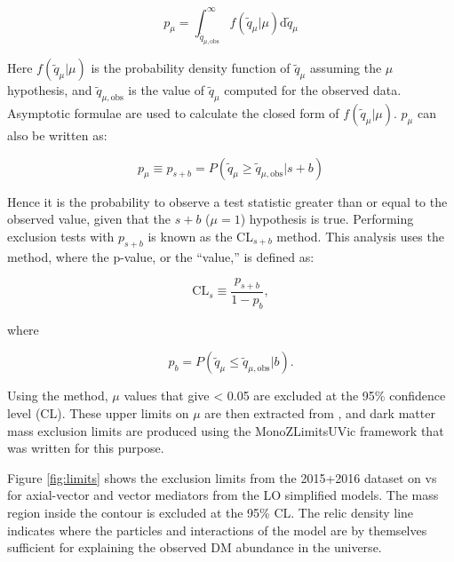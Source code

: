 \begin{equation}
p_\mu = \int_{\tilde{q}_{\mu,\text{obs}}}^\infty f(\tilde{q}_\mu | \mu) \text{d}\tilde{q}_\mu
\label{eqn:pmu}
\end{equation}

\noindent Here $f(\tilde{q}_\mu | \mu)$ is the probability density function of $\tilde{q}_\mu$ assuming the $\mu$ hypothesis, and $\tilde{q}_{\mu,\text{obs}}$ is the value of $\tilde{q}_\mu$ computed for the observed data.
Asymptotic formulae \cite{Cowan:2010js} are used to calculate the closed form of $f(\tilde{q}_\mu | \mu)$. $p_\mu$ can also be written as:

\begin{equation}
p_\mu \equiv p_{s+b} = P(\tilde q_\mu \geq \tilde{q}_{\mu,\text{obs}} | s+b)
\end{equation}

\noindent Hence it is the probability to observe a test statistic greater than or equal to the observed value, given that the $s+b$ ($\mu=1$) hypothesis is true. Performing exclusion tests with $p_{s+b}$ is known as the CL$_{s+b}$ method. This analysis uses the \cls method, where the p-value, or the ``\cls value,'' is defined as:

\begin{equation}
\text{CL}_s \equiv \frac{p_{s+b}}{1-p_b},
\end{equation}

\noindent where 

\begin{equation}
p_b = P(\tilde q_\mu \leq \tilde{q}_{\mu,\text{obs}} | b).
\end{equation}

Using the \cls method, $\mu$ values that give \cls < 0.05 are excluded at the 95\% confidence level (CL). These upper limits on $\mu$ are then extracted from \histfitter, and dark matter mass exclusion limits are produced using the MonoZLimitsUVic framework that was written for this purpose.

Figure \ref{fig:limits} shows the exclusion limits from the 2015+2016 dataset on \mchi vs \mmed for axial-vector and vector mediators from the LO simplified models. The mass region inside the contour is excluded at the 95\% CL. The relic density line indicates where the particles and interactions of the model are by themselves sufficient for explaining the observed DM abundance in the universe.

